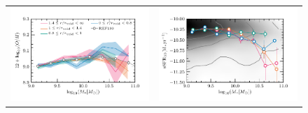 \documentclass[a4paper,fleqn,usenatbib,letter]{mnras}
\begin{document}
\begin{figure}	
	\begin{tabular}{cc}
	

	\includegraphics[width=1\columnwidth]{plots_stellarmass_central/mass_metallicity_threeregions_v1.pdf} &
 	\includegraphics[width=1\columnwidth]{plots_stellarmass_central/mass_ssfr_threeregions.pdf} \\
    

\end{tabular}
\end{figure}
\end{document}
